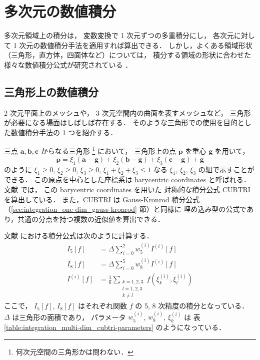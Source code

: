 %

\chapter{多次元の数値積分}

多次元領域上の積分は，
変数変換で 1 次元ずつの多重積分にし，
各次元に対して 1 次元の数値積分手法を適用すれば算出できる．
しかし，よくある領域形状（三角形，直方体，四面体など）については，
積分する領域の形状に合わせた様々な数値積分公式が研究されている
\cite{Cools1993}．

\section{三角形上の数値積分}

2 次元平面上のメッシュや，
3 次元空間内の曲面を表すメッシュなど，
三角形が必要になる場面はしばしば存在する．
そのような三角形での使用を目的とした数値積分手法の 1 つを紹介する．

三点 $\bm{a}, \bm{b}, \bm{c}$ からなる三角形
\footnote{何次元空間の三角形かは問わない．}
において，
三角形上の点 $\bm{p}$ を重心 $\bm{g}$ を用いて，
\begin{equation}
    \bm{p} = \xi_1 (\bm{a} - \bm{g}) + \xi_2 (\bm{b} - \bm{g}) + \xi_3 (\bm{c} - \bm{g}) + \bm{g}
\end{equation}
のように
$\xi_1 \ge 0$,
$\xi_2 \ge 0$,
$\xi_3 \ge 0$,
$\xi_1 + \xi_2 + \xi_3 \le 1$
なる $\xi_1$, $\xi_2$, $\xi_3$ の組で示すことができる．
この原点を中心とした座標系は
barycentric coordinates
と呼ばれる．
文献 \cite{Laurie1982} では，
この barycentric coordinates を用いた
対称的な積分公式  CUBTRI を算出している．
また，CUBTRI は Gauss-Kronrod 積分公式（\ref{sec:integration_one-dim_gauss-kronrod} 節）と同様に
埋め込み型の公式であり，共通の分点を持つ複数の近似値を算出できる．

文献 \cite{Laurie1982} における積分公式は次のように計算する．
\begin{align}
    I_5[f]     & = \Delta \sum_{i=0}^2 w_5^{(i)} I^{(i)}[f] \\
    I_8[f]     & = \Delta \sum_{i=0}^5 w_8^{(i)} I^{(i)}[f] \\
    I^{(i)}[f] & = \frac{1}{6} \sum_{\substack{k = 1, 2, 3  \\ l = 1, 2, 3 \\ k \neq l}}
    f(\xi_k^{(i)}, \xi_l^{(i)})
\end{align}
ここで，
$I_5[f]$, $I_8[f]$ はそれぞれ関数 $f$ の 5, 8 次精度の積分となっている．
$\Delta$ は三角形の面積であり，
パラメータ $w_5^{(i)}$, $w_8^{(i)}$, $\xi_k^{(i)}$ は
表 \ref{table:integration_multi-dim_cubtri-parameters} のようになっている．

